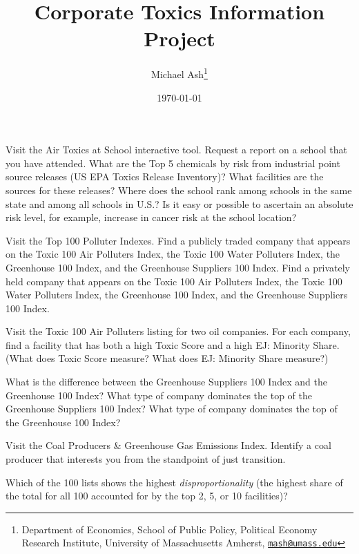 \documentclass[fleqn, 12pt]{exam}
\title{Corporate Toxics Information Project}
\author{Michael Ash\thanks{Department of Economics, School of Public Policy, Political Economy Research Institute, University of Massachusetts Amherst, \href{mailto:mash@umass.edu}{\tt mash@umass.edu}}}
\date{\today}
\begin{document}
\maketitle
\thispagestyle{empty}

\begin{center}
\end{center}

\begin{questions}

  \question Visit the Air Toxics at School interactive tool. Request a report on a school that you have attended. What are the Top 5 chemicals by risk from industrial point source releases (US EPA Toxics Release Inventory)? What facilities are the sources for these releases?  Where does the school rank among schools in the same state and among all schools in U.S.?  Is it easy or possible to ascertain an absolute risk level, for example, increase in cancer risk at the school location?

  \question Visit the Top 100 Polluter Indexes.  Find a publicly traded company that appears on the Toxic 100 Air Polluters Index, the Toxic 100 Water Polluters Index, the Greenhouse 100 Index, and the Greenhouse Suppliers 100 Index. Find a privately held company that appears on the Toxic 100 Air Polluters Index, the Toxic 100 Water Polluters Index, the Greenhouse 100 Index, and the Greenhouse Suppliers 100 Index.

  \question Visit the Toxic 100 Air Polluters listing for two oil companies.  For each company, find a facility that has both a high Toxic Score and a high EJ: Minority Share.  (What does Toxic Score measure?  What does EJ: Minority Share measure?)

    
  \question What is the difference between the Greenhouse Suppliers 100 Index and the Greenhouse 100 Index?  What type of company dominates the top of the Greenhouse Suppliers 100 Index?  What type of company dominates the top of the Greenhouse 100 Index?

  \question Visit the Coal Producers \& Greenhouse Gas Emissions Index.  Identify a coal producer that interests you from the standpoint of just transition. 

  \question Which of the 100 lists shows the highest \emph{disproportionality} (the highest share of the total for all 100 accounted for by the top 2, 5, or 10 facilities)?


    
    
    

\end{questions}
\end{document}
